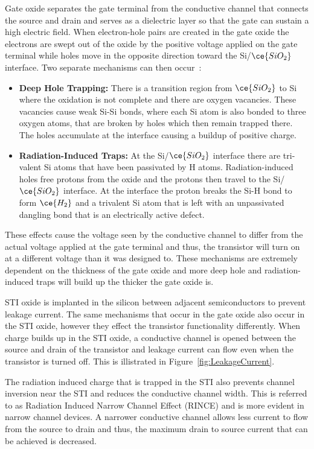 Gate oxide separates the gate terminal from the conductive channel that connects the source and drain and serves as a dielectric layer so that the gate can sustain a high electric field. When electron-hole pairs are created in the gate oxide the electrons are swept out of the oxide by the positive voltage applied on the gate terminal while holes move in the opposite direction toward the Si/$\ce{SiO_{2}}$ interface. Two separate mechanisms can then occur~\cite{TIDEffects}: 
\begin{itemize}
\item \textbf{Deep Hole Trapping:}  There is a transition region from $\ce{SiO_{2}}$ to Si where the oxidation is not complete and there are oxygen vacancies. These vacancies cause weak Si-Si bonds, where each Si atom is also bonded to three oxygen atoms, that are broken by holes which then remain trapped there. The holes accumulate at the interface causing a buildup of positive charge.
\item \textbf{Radiation-Induced Traps:} At the Si/$\ce{SiO_{2}}$ interface there are tri-valent Si atoms that have been passivated by H atoms. Radiation-induced holes free protons from the oxide and the protons then travel to the Si/$\ce{SiO_{2}}$ interface. At the interface the proton breaks the Si-H bond to form $\ce{H_{2}}$ and a trivalent Si atom that is left with an unpassivated dangling bond that is an electrically active defect.
\end{itemize}
These effects cause the voltage seen by the conductive channel to differ from the actual voltage applied at the gate terminal and thus, the transistor will turn on at a different voltage than it was designed to. These mechanisms are extremely dependent on the thickness of the gate oxide and more deep hole and radiation-induced traps will build up the thicker the gate oxide is. 

STI oxide is implanted in the silicon between adjacent semiconductors to prevent leakage current. The same mechanisms that occur in the gate oxide also occur in the STI oxide, however they effect the transistor functionality differently. When charge builds up in the STI oxide, a conductive channel is opened between the source and drain of the transistor and leakage current can flow even when the transistor is turned off. This is illistrated in Figure~\ref{fig:LeakageCurrent}\cite{LeakageCurrent}. 

The radiation induced charge that is trapped in the STI also prevents channel inversion near the STI and reduces the conductive channel width. This is referred to as Radiation Induced Narrow Channel Effect (RINCE)\cite{RINCE} and is more evident in narrow channel devices. A narrower conductive channel allows less current to flow from the source to drain and thus, the maximum drain to source current that can be achieved is decreased.

